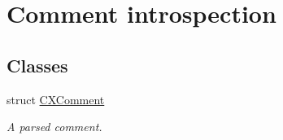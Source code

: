 \hypertarget{group__CINDEX__COMMENT}{}\section{Comment introspection}
\label{group__CINDEX__COMMENT}
\subsection*{Classes}
\begin{DoxyCompactItemize}
\item 
struct \mbox{\hyperlink{structCXComment}{C\+X\+Comment}}
\begin{DoxyCompactList}\small\item\em A parsed comment. \end{DoxyCompactList}\end{DoxyCompactItemize}
